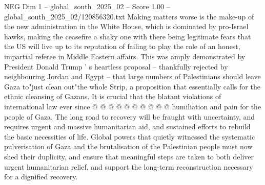 \begin{textsample}{NEG Dim 1 – global\_south\_2025\_02 – Score 1.00 – global\_south\_2025\_02/120856320.txt}
Making matters worse is the make-up of the new administration in the White House, which is dominated by pro-Israel hawks, making the ceasefire a shaky one with there being legitimate fears that the US will live up to its reputation of failing to play the role of an honest, impartial referee in Middle Eastern affairs.
This was amply demonstrated by President Donald Trump ' s heartless proposal -- thankfully rejected by neighbouring Jordan and Egypt -- that large numbers of Palestinians should leave Gaza to"just clean out"the whole Strip, a proposition that essentially calls for the ethnic cleansing of Gazans.
It is crucial that the blatant violations of international law ever since @ @ @ @ @ @ @ @ @ @ humiliation and pain for the people of Gaza.
The long road to recovery will be fraught with uncertainty, and requires urgent and massive humanitarian aid, and sustained efforts to rebuild the basic necessities of life.
Global powers that quietly witnessed the systematic pulverisation of Gaza and the brutalisation of the Palestinian people must now shed their duplicity, and ensure that meaningful steps are taken to both deliver urgent humanitarian relief, and support the long-term reconstruction necessary for a dignified recovery.

\end{textsample}
